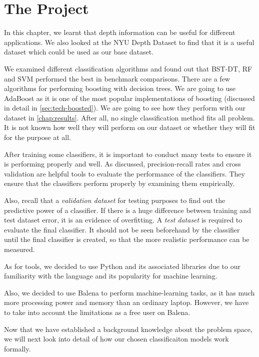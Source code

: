 \newpage
\section{The Project}
In this chapter, we learnt that depth information can be useful for different applications. We also looked at the NYU Depth Dataset to find that it is a useful dataset which could be used as our base dataset.

We examined different classification algorithms and found out that BST-DT, RF and SVM performed the best in benchmark comparisons. There are a few algorithms for performing boosting with decision trees. We are going to use AdaBoost as it is one of the most popular implementations of boosting (discussed in detail in \autoref{sec:tech-boosted}). We are going to see how they perform with our dataset in \autoref{chap:results}. After all, no single classification method fits all problem. It is not known how well they will perform on our dataset or whether they will fit for the purpose at all.

After training some classifiers, it is important to conduct many tests to ensure it is performing properly and well. As discussed, precision-recall rates and cross validation are helpful tools to evaluate the performance of the classifiers. They ensure that the classifiers perform properly by examining them empirically. 

Also, recall that a \textit{validation dataset} for testing purposes to find out the predictive power of a classifier. If there is a huge difference between training and test dataset error, it is an evidence of overfitting. A \textit{test dataset} is required to evaluate the final classifier. It should not be seen beforehand by the classifier until the final classifier is created, so that the more realistic performance can be measured.

As for tools, we decided to use Python and its associated libraries due to our familiarity with the language and its popularity for machine learning. 

Also, we decided to use Balena to perform machine-learning tasks, as it has much more processing power and memory than an ordinary laptop. However, we have to take into account the limitations as a free user on Balena. 

Now that we have established a background knowledge about the problem space, we will next look into detail of how our chosen classificaiton models work formally.
